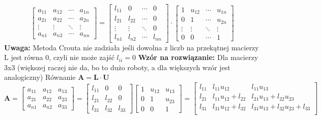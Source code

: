 \documentclass[a4paper]{article}
\begin{document}
$$\begin{bmatrix}
a_{11} & a_{12} & \cdots & a_{1n} \\
a_{21} & a_{22} & \cdots & a_{2n} \\
\vdots & \vdots & \ddots & \vdots \\
a_{n1} & a_{n2} & \cdots & a_{nn}
\end{bmatrix} =
\begin{bmatrix}
l_{11}      & 0      & \cdots & 0 \\
l_{21} & l_{22}      & \cdots & 0 \\
\vdots & \vdots & \ddots & 0 \\
l_{n1} & l_{n2} & \cdots & l_{nn}
\end{bmatrix} \cdot
\begin{bmatrix}
1 & u_{12} & \cdots & u_{1n} \\
0      & 1 & \cdots & u_{2n} \\
\vdots & \vdots & \ddots & \vdots \\
0      & 0      & \cdots & 1
\end{bmatrix}$$
\textbf{Uwaga:} Metoda Crouta nie zadziała jeśli dowolna z liczb na przekątnej macierzy L jest równa 0, czyli nie może zajść $l_{ii} = 0$
\newline \newline
\textbf{Wzór na rozwiązanie:} 
\newline \newline
Dla macierzy 3x3 (większej raczej nie da, bo to dużo roboty, a dla większych wzór jest analogiczny)
\newline
Równanie $\mathbf{A} = \mathbf{L} \cdot \mathbf{U}$
$$ \mathbf{A} =
\begin{bmatrix}
a_{11} & a_{12} &  a_{13} \\
a_{21} & a_{22} &  a_{23} \\
a_{n1} & a_{n2} & a_{33}
\end{bmatrix} = 
\begin{bmatrix}
l_{11}      & 0      & 0 \\
l_{21} & l_{22}      & 0 \\
l_{31} & l_{32} & l_{33}
\end{bmatrix} 
\begin{bmatrix}
1 & u_{12} & u_{13} \\
0      & 1 &  u_{23} \\
0      & 0      &  1
\end{bmatrix} =
\begin{bmatrix}
l_{11} & l_{11}u_{12} & l_{11}u_{13} \\
l_{21} &l_{11}u_{12} + l_{22} & l_{21}u_{13} + l_{22}u_{23} \\
l_{31} & l_{31}u_{12} + l_{32} & l_{31}u_{13} + l_{32}u_{23} + l_{33} \\
\end{bmatrix}$$
\end{document}
